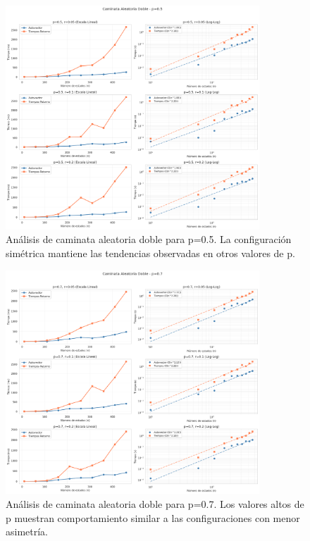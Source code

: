 \begin{figure}[h]
\centering
\includegraphics[width=0.85\textwidth]{../images/caminata_doble_p_0.5.png}
\caption{Análisis de caminata aleatoria doble para p=0.5. La configuración simétrica mantiene las tendencias observadas en otros valores de p.}
\label{fig:caminata_doble_p05}
\end{figure}

\begin{figure}[h]
\centering
\includegraphics[width=0.85\textwidth]{../images/caminata_doble_p_0.7.png}
\caption{Análisis de caminata aleatoria doble para p=0.7. Los valores altos de p muestran comportamiento similar a las configuraciones con menor asimetría.}
\label{fig:caminata_doble_p07}
\end{figure}


